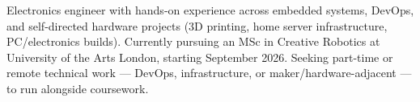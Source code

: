 Electronics engineer with hands-on experience across embedded systems, DevOps, and self-directed hardware projects (3D printing, home server infrastructure, PC/electronics builds). Currently pursuing an MSc in Creative Robotics at University of the Arts London, starting September 2026. Seeking part-time or remote technical work — DevOps, infrastructure, or maker/hardware-adjacent — to run alongside coursework.
